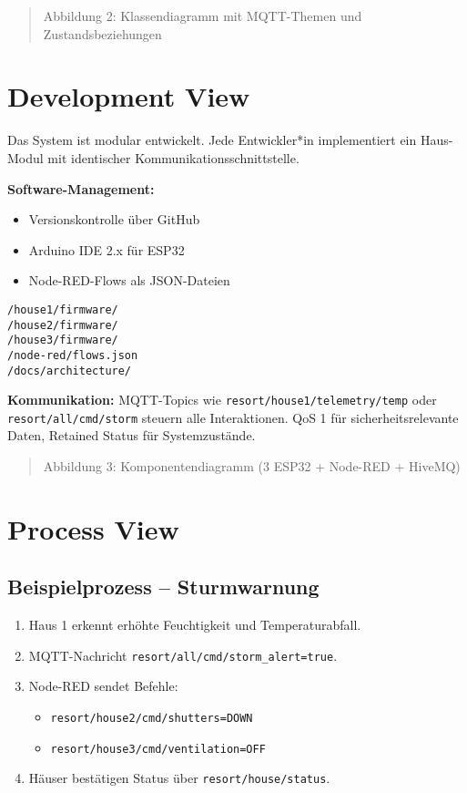 \documentclass[12pt,a4paper]{article}
\begin{document}
\begin{quote}
Abbildung 2: Klassendiagramm mit MQTT-Themen und Zustandsbeziehungen
\end{quote}

\section{Development View}
Das System ist modular entwickelt.
Jede Entwickler*in implementiert ein Haus-Modul mit identischer Kommunikationsschnittstelle.

\textbf{Software-Management:}
\begin{itemize}[noitemsep]
  \item Versionskontrolle über GitHub
  \item Arduino IDE 2.x für ESP32
  \item Node-RED-Flows als JSON-Dateien
\end{itemize}

\begin{verbatim}
/house1/firmware/
/house2/firmware/
/house3/firmware/
/node-red/flows.json
/docs/architecture/
\end{verbatim}

\textbf{Kommunikation:}
MQTT-Topics wie \texttt{resort/house1/telemetry/temp} oder
\texttt{resort/all/cmd/storm} steuern alle Interaktionen.
QoS 1 für sicherheitsrelevante Daten, Retained Status für Systemzustände.

\begin{quote}
Abbildung 3: Komponentendiagramm (3 ESP32 + Node-RED + HiveMQ)
\end{quote}

\newpage
\section{Process View}
\subsection{Beispielprozess – Sturmwarnung}
\begin{enumerate}[noitemsep]
  \item Haus 1 erkennt erhöhte Feuchtigkeit und Temperaturabfall.
  \item MQTT-Nachricht \texttt{resort/all/cmd/storm\_alert=true}.
  \item Node-RED sendet Befehle:
  \begin{itemize}
    \item \texttt{resort/house2/cmd/shutters=DOWN}
    \item \texttt{resort/house3/cmd/ventilation=OFF}
  \end{itemize}
  \item Häuser bestätigen Status über \texttt{resort/{house}/status}.
\end{enumerate}
\end{document}
